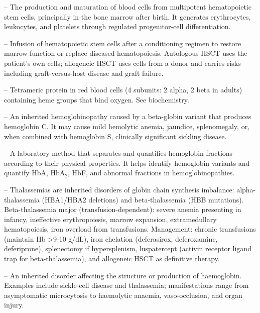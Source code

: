 -- The production and maturation of blood cells from multipotent hematopoietic stem cells, principally in the bone marrow after birth. It generates erythrocytes, leukocytes, and platelets through regulated progenitor-cell differentiation.

-- Infusion of hematopoietic stem cells after a conditioning regimen to restore marrow function or replace diseased hematopoiesis. Autologous HSCT uses the patient’s own cells; allogeneic HSCT uses cells from a donor and carries risks including graft-versus-host disease and graft failure.

-- Tetrameric protein in red blood cells (4 subunits: 2 alpha, 2 beta in adults) containing heme groups that bind oxygen. See biochemistry.

-- An inherited hemoglobinopathy caused by a beta-globin variant that produces hemoglobin C. It may cause mild hemolytic anemia, jaundice, splenomegaly, or, when combined with hemoglobin S, clinically significant sickling disease.

-- A laboratory method that separates and quantifies hemoglobin fractions according to their physical properties. It helps identify hemoglobin variants and quantify HbA, HbA$_2$, HbF, and abnormal fractions in hemoglobinopathies.

-- Thalassemias are inherited disorders of globin chain synthesis imbalance: alpha-thalassemia (HBA1/HBA2 deletions) and beta-thalassemia (HBB mutations). Beta-thalassemia major (transfusion-dependent): severe anemia presenting in infancy, ineffective erythropoiesis, marrow expansion, extramedullary hematopoiesis, iron overload from transfusions. Management: chronic transfusions (maintain Hb >9-10 g/dL), iron chelation (deferasirox, deferoxamine, deferiprone), splenectomy if hypersplenism, luspatercept (activin receptor ligand trap for beta-thalassemia), and allogeneic HSCT as definitive therapy.

-- An inherited disorder affecting the structure or production of haemoglobin. Examples include sickle-cell disease and thalassemia; manifestations range from asymptomatic microcytosis to haemolytic anaemia, vaso-occlusion, and organ injury.

